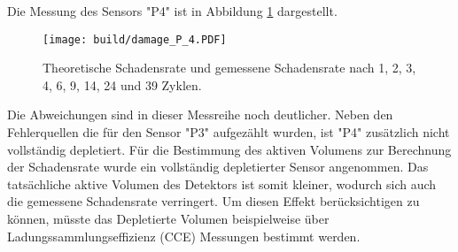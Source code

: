Die Messung des Sensors "P4" ist in Abbildung \ref{fig:P_4}
dargestellt.

\begin{figure}
  \centering
    \texttt{[image: build/damage\_P\_4.PDF]}
\caption{Theoretische Schadensrate und gemessene Schadensrate nach 1, 2, 3, 4, 6, 9, 14, 24 und 39 Zyklen.}
\label{fig:P_4}
\end{figure}

Die Abweichungen sind in dieser Messreihe noch deutlicher. Neben den Fehlerquellen die
für den Sensor "P3" aufgezählt wurden, ist "P4" zusätzlich nicht vollständig depletiert.
Für die Bestimmung des aktiven Volumens zur Berechnung der Schadensrate wurde ein vollständig
depletierter Sensor angenommen. Das tatsächliche aktive Volumen des Detektors ist somit kleiner, wodurch sich auch
die gemessene Schadensrate verringert.
Um diesen Effekt berücksichtigen zu können, müsste das Depletierte Volumen
beispielweise über Ladungssammlungseffizienz (CCE) Messungen bestimmt werden.

